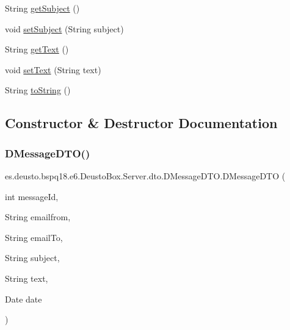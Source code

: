 \begin{DoxyCompactItemize}
String \mbox{\hyperlink{classes_1_1deusto_1_1bspq18_1_1e6_1_1_deusto_box_1_1_server_1_1dto_1_1_d_message_d_t_o_ae05743c709d45e637bc32e528383ade1}{get\+Subject}} ()
\item 
void \mbox{\hyperlink{classes_1_1deusto_1_1bspq18_1_1e6_1_1_deusto_box_1_1_server_1_1dto_1_1_d_message_d_t_o_aad5c55522cd6816f6e621fc81942aa6a}{set\+Subject}} (String subject)
\item 
String \mbox{\hyperlink{classes_1_1deusto_1_1bspq18_1_1e6_1_1_deusto_box_1_1_server_1_1dto_1_1_d_message_d_t_o_aa2eae9f829defa03948a38d4b336e248}{get\+Text}} ()
\item 
void \mbox{\hyperlink{classes_1_1deusto_1_1bspq18_1_1e6_1_1_deusto_box_1_1_server_1_1dto_1_1_d_message_d_t_o_a5e1c3ac4792e1373f2aae255b8e7f33f}{set\+Text}} (String text)
\item 
String \mbox{\hyperlink{classes_1_1deusto_1_1bspq18_1_1e6_1_1_deusto_box_1_1_server_1_1dto_1_1_d_message_d_t_o_a4c55e4dc30a2eb0fd6206999c32fa74a}{to\+String}} ()
\end{DoxyCompactItemize}


\subsection{Constructor \& Destructor Documentation}
\mbox{\label{classes_1_1deusto_1_1bspq18_1_1e6_1_1_deusto_box_1_1_server_1_1dto_1_1_d_message_d_t_o_ace752421cec77a7f53cdabe642fad526}} 
\subsubsection{\texorpdfstring{D\+Message\+D\+T\+O()}{DMessageDTO()}\hspace{0.1cm}{\footnotesize\ttfamily [1/2]}}
{\footnotesize\ttfamily es.\+deusto.\+bspq18.\+e6.\+Deusto\+Box.\+Server.\+dto.\+D\+Message\+D\+T\+O.\+D\+Message\+D\+TO (\begin{DoxyParamCaption}\item[{int}]{message\+Id,  }\item[{String}]{emailfrom,  }\item[{String}]{email\+To,  }\item[{String}]{subject,  }\item[{String}]{text,  }\item[{Date}]{date }\end{DoxyParamCaption})}

